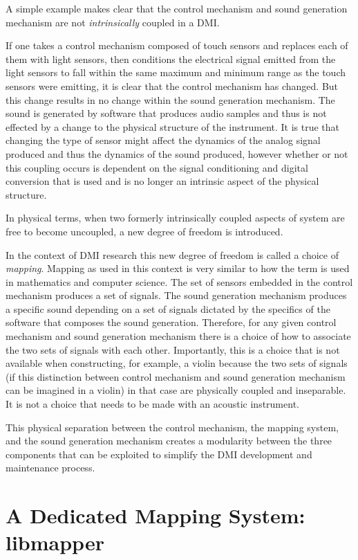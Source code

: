A simple example makes clear that the control mechanism and sound generation mechanism are not \emph{intrinsically} coupled in a DMI.

If one takes a control mechanism composed of touch sensors and replaces each of them with light sensors, then conditions the electrical signal emitted from the light sensors to fall within the same maximum and minimum range as the touch sensors were emitting, it is clear that the control mechanism has changed. But this change results in no change within the sound generation mechanism. The sound is generated by software that produces audio samples and thus is not effected by a change to the physical structure of the instrument. It is true that changing the type of sensor might affect the dynamics of the analog signal produced and thus the dynamics of the sound produced, however whether or not this coupling occurs is dependent on the signal conditioning and digital conversion that is used and is no longer an intrinsic aspect of the physical structure.

In physical terms, when two formerly intrinsically coupled aspects of system are free to become uncoupled, a new degree of freedom is introduced.

In the context of DMI research this new degree of freedom is called a choice of \emph{mapping}. Mapping as used in this context is very similar to how the term is used in mathematics and computer science. The set of sensors embedded in the control mechanism produces a set of signals. The sound generation mechanism produces a specific sound depending on a set of signals dictated by the specifics of the software that composes the sound generation. Therefore, for any given control mechanism and sound generation mechanism there is a choice of how to associate the two sets of signals with each other. Importantly, this is a choice that is not available when constructing, for example, a violin because the two sets of signals (if this distinction between control mechanism and sound generation mechanism can be imagined in a violin) in that case are physically coupled and inseparable. It is not a choice that needs to be made with an acoustic instrument.

This physical separation between the control mechanism, the mapping system, and the sound generation mechanism creates a modularity between the three components that can be exploited to simplify the DMI development and maintenance process.

\section{A Dedicated Mapping System: libmapper}


